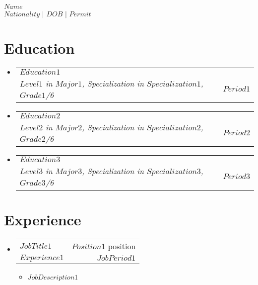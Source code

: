 \documentclass[letterpaper,11pt]{article}
\makeatletter
\newcommand{\resumeItem}[1]{
  \item\small{
    {#1 \vspace{-2pt}}
  }
}
\newcommand{\resumeSubheadingW}[4]{
  \vspace{-2pt}\item
    \begin{tabular*}{0.97\textwidth}[t]{l@{\extracolsep{\fill}}r}
      \textbf{#1} & #2 \\
      \textit{\small#3} & \textit{\small #4} 
    \end{tabular*}\vspace{-7pt}
}
\newcommand{\resumeSubSubheading}[2]{
    \item
    \begin{tabular*}{0.97\textwidth}{l@{\extracolsep{\fill}}r}
      \textit{\small#1} & \textit{\small #2} \\
    \end{tabular*}\vspace{-7pt}
}
\newcommand{\resumeSubHeadingListStart}{\begin{itemize}[leftmargin=0.15in,rightmargin=1.8in, leftmargin=0.15in, label={}]}
\newcommand{\resumeSubHeadingListEnd}{\end{itemize}}
\newcommand{\resumeItemListStart}{\begin{itemize}\justifying}
\newcommand{\resumeItemListEnd}{\end{itemize}\vspace{-5pt}}
\makeatother
\begin{document}

\begin{center}
    \textbf{\huge \scshape $Name$} \\ \vspace{2pt}
     $Nationality$ $|$ $DOB$ $|$ $Permit$
\end{center}


\section{Education}
  \resumeSubHeadingListStart
    \resumeSubheadingW
      {$Education1$}{ }
      {$Level1$ in $Major1$, Specialization in $Specialization1$, $Grade1$/6}{$Period1$}
    \resumeSubheadingW
      {$Education2$}{ }
      {$Level2$ in $Major2$, Specialization in $Specialization2$, $Grade2$/6}{$Period2$}
     \resumeSubheadingW
      {$Education3$}{ }
      {$Level3$ in $Major3$, Specialization in $Specialization3$, $Grade3$/6}{$Period3$}
  \resumeSubHeadingListEnd


\section{Experience}
  \resumeSubHeadingListStart
    \resumeSubheadingW
      {$JobTitle1$}{$Position1$ position}
      {$Experience1$}{$JobPeriod1$}{}
      \resumeItemListStart
        \resumeItem{$JobDescription1$}
      \resumeItemListEnd
      



  \resumeSubHeadingListEnd
\end{document}
